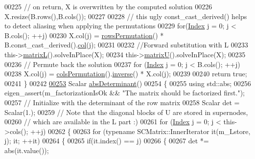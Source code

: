 \begin{DoxyCode}
00225       \textcolor{comment}{// on return, X is overwritten by the computed solution}
00226       X.resize(B.rows(),B.cols());
00227 
00228       \textcolor{comment}{// this ugly const\_cast\_derived() helps to detect aliasing when applying the permutations}
00229       \textcolor{keywordflow}{for}(\hyperlink{namespace_eigen_a62e77e0933482dafde8fe197d9a2cfde}{Index} j = 0; j < B.cols(); ++j)
00230         X.col(j) = \hyperlink{group___sparse_l_u___module_a691295e65c06df599876d78ac2c7fada}{rowsPermutation}() * B.const\_cast\_derived().\hyperlink{group___core___module_a469583ed90462820888344e63ebe1a80}{col}(j);
00231       
00232       \textcolor{comment}{//Forward substitution with L}
00233       this->\hyperlink{group___sparse_l_u___module_a634abe55e5a076f2e10db78871105a8f}{matrixL}().solveInPlace(X);
00234       this->\hyperlink{group___sparse_l_u___module_aaf395a8fca527144215ff19cc7b8b637}{matrixU}().solveInPlace(X);
00235       
00236       \textcolor{comment}{// Permute back the solution }
00237       \textcolor{keywordflow}{for} (\hyperlink{namespace_eigen_a62e77e0933482dafde8fe197d9a2cfde}{Index} j = 0; j < B.cols(); ++j)
00238         X.col(j) = \hyperlink{group___sparse_l_u___module_ab7b0d15d0d9fd1faa164298f92ca59cd}{colsPermutation}().\hyperlink{group___core___module_adb9af427f317202366c2832876064eb3}{inverse}() * X.col(j);
00239       
00240       \textcolor{keywordflow}{return} \textcolor{keyword}{true}; 
00241     \}
00242     
\hyperlink{group___sparse_l_u___module_a06fa89424239fb169d408f08252426d0}{00253}     Scalar \hyperlink{group___sparse_l_u___module_a06fa89424239fb169d408f08252426d0}{absDeterminant}()
00254     \{
00255       \textcolor{keyword}{using} std::abs;
00256       eigen\_assert(m\_factorizationIsOk && \textcolor{stringliteral}{"The matrix should be factorized first."});
00257       \textcolor{comment}{// Initialize with the determinant of the row matrix}
00258       Scalar det = Scalar(1.);
00259       \textcolor{comment}{// Note that the diagonal blocks of U are stored in supernodes,}
00260       \textcolor{comment}{// which are available in the  L part :)}
00261       \textcolor{keywordflow}{for} (\hyperlink{namespace_eigen_a62e77e0933482dafde8fe197d9a2cfde}{Index} j = 0; j < this->cols(); ++j)
00262       \{
00263         \textcolor{keywordflow}{for} (\textcolor{keyword}{typename} SCMatrix::InnerIterator it(m\_Lstore, j); it; ++it)
00264         \{
00265           \textcolor{keywordflow}{if}(it.index() == j)
00266           \{
00267             det *= abs(it.value());

\end{DoxyCode}
